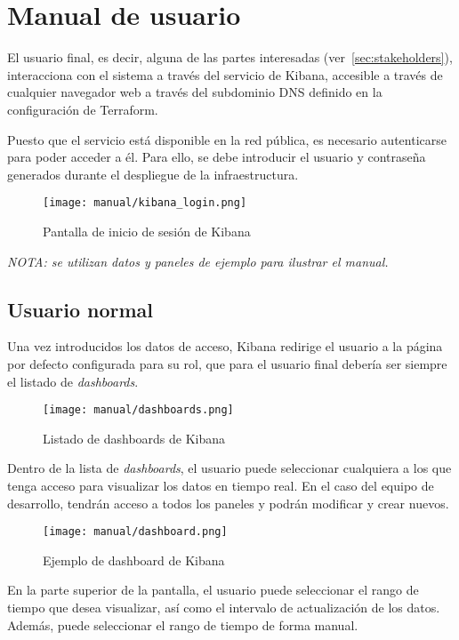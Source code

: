 \section{Manual de usuario}\label{sec:manual_usuario}
El usuario final, es decir, alguna de las partes interesadas
(ver~\ref{sec:stakeholders}), interacciona con el sistema a través del
servicio de Kibana, accesible a través de cualquier navegador web a través
del subdominio DNS definido en la configuración de Terraform.

Puesto que el servicio está disponible en la red pública, es necesario
autenticarse para poder acceder a él. Para ello, se debe introducir el
usuario y contraseña generados durante el despliegue de la infraestructura.

\begin{figure}[H]
	\centering
  	\texttt{[image: manual/kibana\_login.png]}
  	\caption{Pantalla de inicio de sesión de Kibana}
  \label{fig:login}
\end{figure}

\emph{NOTA: se utilizan datos y paneles de ejemplo para ilustrar el manual.}


\newpage{}
\subsection{Usuario normal}
Una vez introducidos los datos de acceso, Kibana redirige el usuario a la
página por defecto configurada para su rol, que para el usuario final debería
ser siempre el listado de \textit{dashboards}.

\begin{figure}[H]
	\centering
  	\texttt{[image: manual/dashboards.png]}
  	\caption{Listado de dashboards de Kibana}
  \label{fig:dashboards}
\end{figure}

Dentro de la lista de \textit{dashboards}, el usuario puede seleccionar
cualquiera a los que tenga acceso para visualizar los datos en tiempo real.
En el caso del equipo de desarrollo, tendrán acceso a todos los paneles y
podrán modificar y crear nuevos.

\begin{figure}[H]
	\centering
  	\texttt{[image: manual/dashboard.png]}
  	\caption{Ejemplo de dashboard de Kibana}
  \label{fig:dashboard}
\end{figure}

En la parte superior de la pantalla, el usuario puede seleccionar el rango de
tiempo que desea visualizar, así como el intervalo de actualización de los
datos. Además, puede seleccionar el rango de tiempo de forma manual.

